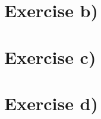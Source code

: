 \documentclass[norsk, 12pt]{article}
\begin{document}
\section*{Exercise b)}
\section*{Exercise c)}

\section*{Exercise d)}
\end{document}
